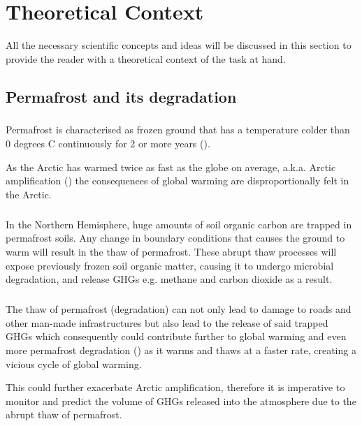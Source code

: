 \chapter{Theoretical Context} \label{lit_review}

All the necessary scientific concepts and ideas will be discussed in this section to provide the reader with a theoretical context of the task at hand.

\section{Permafrost and its degradation}  \label{perma_intro}
\paragraph{}
Permafrost is characterised as frozen ground that has a temperature colder than 0 degrees C continuously for 2 or more years (\cite{everdingen_multi-language_1998}).

As the Arctic has warmed twice as fast as the globe on average, \gls{a.k.a.} Arctic amplification (\cite{climatechangefur}) the consequences of global warming are disproportionally felt in the Arctic. 

\paragraph{}
In the Northern Hemisphere, huge amounts of soil organic carbon are trapped in permafrost soils. Any change in boundary conditions that causes the ground to warm will result in the thaw of permafrost. These abrupt thaw processes will expose previously frozen soil organic matter, causing it to undergo microbial degradation, and release GHGs e.g. methane and carbon dioxide as a result.
\paragraph{}
The thaw of permafrost (degradation) can not only lead to damage to roads and other man-made infrastructures but also lead to the release of said trapped GHGs which consequently could contribute further to global warming and even more permafrost degradation (\cite{MURTON2021857}) as it warms and thaws at a faster rate, creating a vicious cycle of global warming.


This could further exacerbate Arctic amplification, therefore it is imperative to monitor and predict the volume of GHGs released into the atmosphere due to the abrupt thaw of permafrost.

